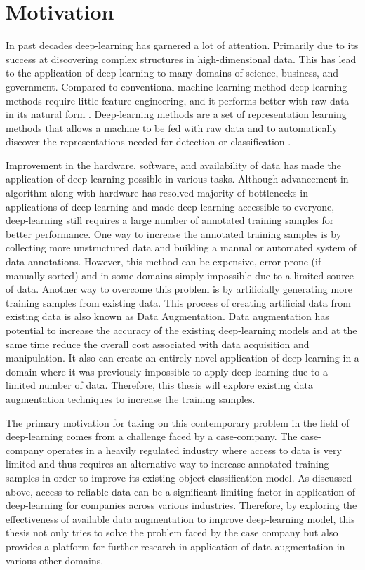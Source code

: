 \documentclass[12pt,a4paper,oneside,pdftex]{report}
\begin{document}
	
	\section{Motivation}
	\label{chapter:intro}
	
	In past decades deep-learning has garnered a lot of attention. Primarily due to its success at discovering complex structures in high-dimensional data. This has lead to the application of deep-learning to many domains of science, business, and government. Compared to conventional machine learning method deep-learning methods require little feature engineering, and it performs better with raw data in its natural form \citep{lecun2015deep}. Deep-learning methods are a set of representation learning methods that allows a machine to be fed with raw data and to automatically discover the representations needed for detection or classification \citep{lecun2015deep}. 
	
	
	Improvement in the hardware, software, and availability of data has made the application of deep-learning possible in various tasks. Although advancement in algorithm along with hardware has resolved majority of bottlenecks in applications of deep-learning and made deep-learning accessible to everyone, deep-learning still requires a large number of annotated training samples for better performance. One way to increase the annotated training samples is by collecting more unstructured data and building a manual or automated system of data annotations. However, this method can be expensive, error-prone (if manually sorted) and in some domains simply impossible due to a limited source of data. Another way to overcome this problem is by artificially generating more training samples from existing data. This process of creating artificial data from existing data is also known as Data Augmentation. Data augmentation has potential to increase the accuracy of the existing deep-learning models and at the same time reduce the overall cost associated with data acquisition and manipulation. It also can create an entirely novel application of deep-learning in a domain where it was previously impossible to apply deep-learning due to a limited number of data. Therefore, this thesis will explore existing data augmentation techniques to increase the training samples.
	
	The primary motivation for taking on this contemporary problem in the field of deep-learning comes from a challenge faced by a case-company. The case-company operates in a heavily regulated industry where access to data is very limited and thus requires an alternative way to increase annotated training samples in order to improve its existing object classification model. As discussed above, access to reliable data can be a significant limiting factor in application of deep-learning for companies across various industries. Therefore, by exploring the effectiveness of available data augmentation to improve deep-learning model, this thesis not only tries to solve the problem faced by the case company but also provides a platform for further research in application of data augmentation in various other domains. 
	
\end{document}

